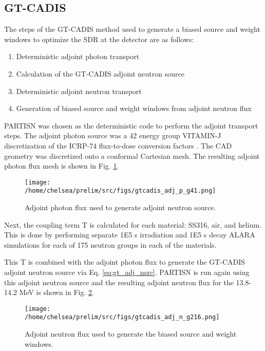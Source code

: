 \subsection{GT-CADIS}\label{sec:gtcadis}
The steps of the GT-CADIS method used to generate a biased source and weight windows to optimize
the SDR at the detector are as follows:
\begin{enumerate}
	\item Deterministic adjoint photon transport
	\item Calculation of the GT-CADIS adjoint neutron source
	\item Deterministic adjoint neutron transport
	\item Generation of biased source and weight windows from adjoint neutron flux
\end{enumerate}

PARTISN \cite{partisn} was chosen as the deterministic code to perform the adjoint transport
steps.  The adjoint photon source was a 42 energy group VITAMIN-J discretization of the
ICRP-74 flux-to-dose conversion factors \cite{f2d}.  The CAD geometry was discretized onto
a conformal Cartesian mesh.  The resulting adjoint photon flux mesh is shown in
Fig. \ref{fig:ex.adj_p_flux}.

\begin{figure}
	\texttt{[image: /home/chelsea/prelim/src/figs/gtcadis\_adj\_p\_g41.png]}
	\caption [GT-CADIS adjoint photon flux] 
	{Adjoint photon flux used to generate adjoint neutron source.\label{fig:ex.adj_p_flux}}
\end{figure}


Next, the coupling term T is calculated for each material: SS316, air, and
helium.  This is done by performing separate 1E5 s irradiation and 1E5 s decay ALARA
simulations for each of 175 neutron groups in each of the materials.

This T is combined with the adjoint photon flux to generate the GT-CADIS
adjoint neutron source via Eq. \ref{eq:gt_adj_nsrc}. 
PARTISN is run again using this adjoint neutron source and the resulting
adjoint neutron flux for the 13.8-14.2 MeV is shown in Fig.
\ref{fig:ex.adj_n_flux}.

\begin{figure}
	\texttt{[image: /home/chelsea/prelim/src/figs/gtcadis\_adj\_n\_g216.png]}
	\caption [GT-CADIS adjoint neutron flux] 
	{Adjoint neutron flux used to generate the biased source and weight
	windows.\label{fig:ex.adj_n_flux} }
\end{figure}

